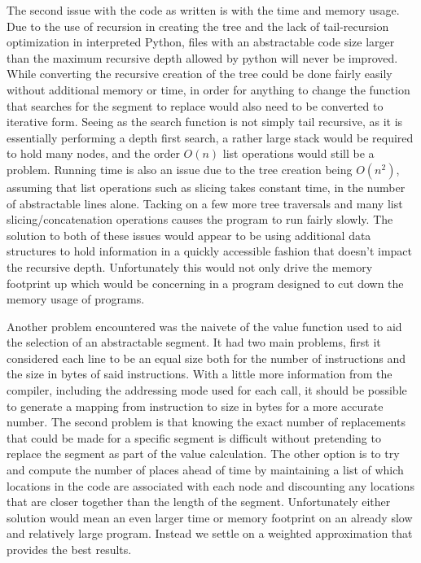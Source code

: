 \documentclass[9pt,nocopyrightspace]{sigplanconf}
\begin{document}
The second issue with the code as written is with the time and memory usage.
Due to the use of recursion in creating the tree and the lack of tail-recursion optimization in interpreted Python, files with an abstractable code size larger than the maximum recursive depth allowed by python will never be improved.
While converting the recursive creation of the tree could be done fairly easily without additional memory or time, in order for anything to change the function that searches for the segment to replace would also need to be converted to iterative form.
Seeing as the search function is not simply tail recursive, as it is essentially performing a depth first search, a rather large stack would be required to hold many nodes, and the order $O(n)$ list operations would still be a problem.
Running time is also an issue due to the tree creation being $O(n^{2})$, assuming that list operations such as slicing takes constant time, in the number of abstractable lines alone.
Tacking on a few more tree traversals and many list slicing/concatenation operations causes the program to run fairly slowly.
The solution to both of these issues would appear to be using additional data structures to hold information in a quickly accessible fashion that doesn't impact the recursive depth.
Unfortunately this would not only drive the memory footprint up which would be concerning in a program designed to cut down the memory usage of programs.

Another problem encountered was the naivete of the value function used to aid the selection of an abstractable segment.
It had two main problems, first it considered each line to be an equal size both for the number of instructions and the size in bytes of said instructions.
With a little more information from the compiler, including the addressing mode used for each call, it should be possible to generate a mapping from instruction to size in bytes for a more accurate number.
The second problem is that knowing the exact number of replacements that could be made for a specific segment is difficult without pretending to replace the segment as part of the value calculation.
The other option is to try and compute the number of places ahead of time by maintaining a list of which locations in the code are associated with each node and discounting any locations that are closer together than the length of the segment.
Unfortunately either solution would mean an even larger time or memory footprint on an already slow and relatively large program.
Instead we settle on a weighted approximation that provides the best results.
\end{document}
